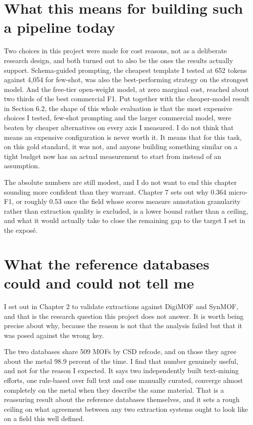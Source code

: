 \documentclass[11pt,a4paper,oneside]{report}
\begin{document}
\section{What this means for building such a pipeline today}

Two choices in this project were made for cost reasons, not as a deliberate research design, and both turned out to also be the ones the results actually support. Schema-guided prompting, the cheapest template I tested at 652 tokens against 4,054 for few-shot, was also the best-performing strategy on the strongest model. And the free-tier open-weight model, at zero marginal cost, reached about two thirds of the best commercial F1. Put together with the cheaper-model result in Section 6.2, the shape of this whole evaluation is that the most expensive choices I tested, few-shot prompting and the larger commercial model, were beaten by cheaper alternatives on every axis I measured. I do not think that means an expensive configuration is never worth it. It means that for this task, on this gold standard, it was not, and anyone building something similar on a tight budget now has an actual measurement to start from instead of an assumption.

The absolute numbers are still modest, and I do not want to end this chapter sounding more confident than they warrant. Chapter 7 sets out why 0.364 micro-F1, or roughly 0.53 once the field whose scores measure annotation granularity rather than extraction quality is excluded, is a lower bound rather than a ceiling, and what it would actually take to close the remaining gap to the target I set in the exposé.

\section{What the reference databases could and could not tell me}

I set out in Chapter 2 to validate extractions against DigiMOF and SynMOF, and that is the research question this project does not answer. It is worth being precise about why, because the reason is not that the analysis failed but that it was posed against the wrong key.

The two databases share 509 MOFs by CSD refcode, and on those they agree about the metal 98.9 percent of the time. I find that number genuinely useful, and not for the reason I expected. It says two independently built text-mining efforts, one rule-based over full text and one manually curated, converge almost completely on the metal when they describe the same material. That is a reassuring result about the reference databases themselves, and it sets a rough ceiling on what agreement between any two extraction systems ought to look like on a field this well defined.
\end{document}
